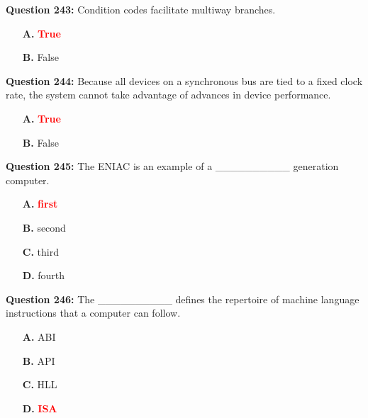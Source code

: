 \documentclass[12pt,a4paper]{article}
\begin{document}
\vspace{0.5cm}

\textbf{Question 243:} Condition codes facilitate multiway branches.

\begin{itemize}
    \item[\textbf{A.}] \textcolor{red}{\textbf{True}}
    \item[\textbf{B.}] False
\end{itemize}

\vspace{0.5cm}

\textbf{Question 244:} Because all devices on a synchronous bus are tied to a fixed clock rate, the system cannot take advantage of advances in device performance.

\begin{itemize}
    \item[\textbf{A.}] \textcolor{red}{\textbf{True}}
    \item[\textbf{B.}] False
\end{itemize}

\vspace{0.5cm}

\textbf{Question 245:} The ENIAC is an example of a __________ generation computer.

\begin{itemize}
    \item[\textbf{A.}] \textcolor{red}{\textbf{first}}
    \item[\textbf{B.}] second
    \item[\textbf{C.}] third
    \item[\textbf{D.}] fourth
\end{itemize}

\vspace{0.5cm}

\textbf{Question 246:} The __________ defines the repertoire of machine language instructions that a computer can follow.

\begin{itemize}
    \item[\textbf{A.}] ABI
    \item[\textbf{B.}] API
    \item[\textbf{C.}] HLL
    \item[\textbf{D.}] \textcolor{red}{\textbf{ISA}}
\end{itemize}

\vspace{0.5cm}
\end{document}

